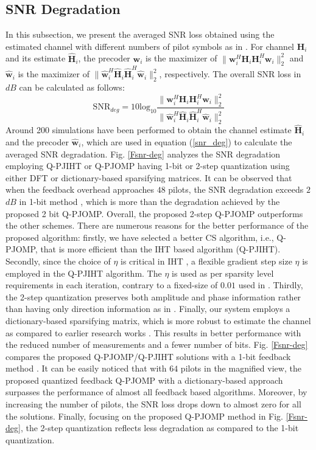 \subsection{SNR Degradation}
In this subsection, we present the averaged SNR loss obtained using the estimated channel with different numbers of pilot symbols as in \cite{mainref-1bit}. For channel $\mathbf{H}_i$ and its estimate $\mathbf{\hat{H}}_i$, the precoder $\mathbf{w}_i$ is the maximizer of $\|\mathbf{w}_i^H \mathbf{H}_i \mathbf{H}_i^H \mathbf{w}_i\|_2^2$ and $\mathbf{\hat{w}}_i$ is the maximizer of  $\|\mathbf{\hat{w}}_i^H \mathbf{\hat{H}}_i \mathbf{\hat{H}}_i^H \mathbf{\hat{w}}_i\|_2^2$, respectively. The overall SNR loss in $dB$ can be calculated as follows\textcolor{black}{:}
\begin{equation}
    \text{SNR}_{deg}=10\text{log}_{10}\frac{\|\mathbf{w}_i^H \mathbf{H}_i \mathbf{H}_i^H \mathbf{w}_i\|_2^2}{\|\mathbf{\hat{w}}_i^H \mathbf{\hat{H}}_i \mathbf{\hat{H}}_i^H \mathbf{\hat{w}}_i\|_2^2}
    \label{snr_deg}
\end{equation}
Around 200 simulations have been performed to obtain the channel estimate $\mathbf{\hat{H}}_i$ and the precoder $\mathbf{\hat{w}}_i$, which are used in equation (\ref{snr_deg}) to calculate the averaged SNR degradation. Fig. \ref{Fsnr-deg} analyzes the SNR degradation employing Q-PJIHT or Q-PJOMP having 1-bit or  2-step quantization using either DFT or dictionary-based sparsifying matrices. It can be observed that when the feedback overhead approaches $48$ pilots, the SNR degradation exceeds $2$ $dB$ in 1-bit method \cite{mainref-1bit}, which is more than the degradation achieved by the proposed 2 bit Q-PJOMP. Overall, the proposed 2-step Q-PJOMP outperforms the other schemes. 
There are numerous reasons for the better performance of the proposed algorithm: firstly, we have selected a better CS algorithm, i.e., Q-PJOMP, that is more efficient than the IHT based algorithm (Q-PJIHT).   Secondly, since the choice of $\eta$ is critical in IHT \cite{Aiht}, a flexible gradient step size $\eta$ is employed in the Q-PJIHT algorithm. The $\eta$ is used as per sparsity level requirements in each iteration, contrary to a fixed-size of $0.01$  used in \cite{mainref-1bit}.  Thirdly, the 2-step quantization preserves both amplitude and phase information rather than having only direction information as in \cite{mainref-1bit}. Finally, our system employs a dictionary-based sparsifying matrix, which is more robust to estimate the channel as compared to earlier research works \cite{mainref-1bit,mainref-joint}.  This results in better performance with the reduced number of measurements and a fewer number of bits\cite{ourwork}.
Fig. \ref{Fsnr-deg} compares the proposed Q-PJOMP/Q-PJIHT solutions with a 1-bit feedback method  \cite{mainref-1bit}. It can be easily noticed that with $64$ pilots in the magnified view, the proposed quantized feedback  Q-PJOMP with a dictionary-based approach surpasses the performance of almost all feedback based algorithms. Moreover, by increasing the number of pilots, the SNR loss drops down to almost zero for all the solutions. Finally, focusing on the proposed Q-PJOMP method in Fig. \ref{Fsnr-deg}, the 2-step quantization reflects less degradation as compared to the 1-bit quantization.
